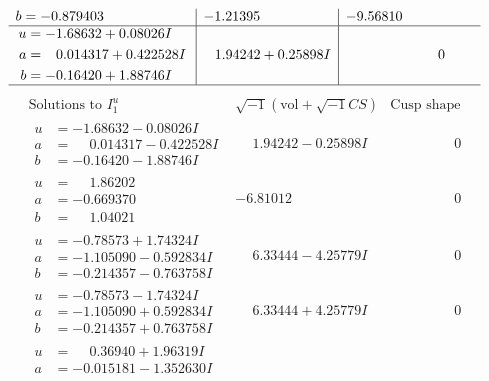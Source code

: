 \documentclass[1p]{elsarticle_modified}
\theoremstyle{definition}
\newcommand{\I}{\sqrt{-1}}
\begin{document}
$$\begin{array}{c|c|c}
\begin{aligned}
b &= -0.879403\phantom{ +0.000000I}\end{aligned}
 & -1.21395\phantom{ +0.000000I} & -9.56810\phantom{ +0.000000I} \\ \hline\begin{aligned}
u &= -1.68632 + 0.08026 I \\
a &= \phantom{-}0.014317 + 0.422528 I \\
b &= -0.16420 + 1.88746 I\end{aligned}
 & \phantom{-}1.94242 + 0.25898 I & \phantom{-0.000000 } 0\\
 \hline 
 \end{array}$$\newpage$$\begin{array}{c|c|c}  
\text{Solutions to }I^u_{1}& \I (\text{vol} + \sqrt{-1}CS) & \text{Cusp shape}\\
 \hline 
\begin{aligned}
u &= -1.68632 - 0.08026 I \\
a &= \phantom{-}0.014317 - 0.422528 I \\
b &= -0.16420 - 1.88746 I\end{aligned}
 & \phantom{-}1.94242 - 0.25898 I & \phantom{-0.000000 } 0 \\ \hline\begin{aligned}
u &= \phantom{-}1.86202\phantom{ +0.000000I} \\
a &= -0.669370\phantom{ +0.000000I} \\
b &= \phantom{-}1.04021\phantom{ +0.000000I}\end{aligned}
 & -6.81012\phantom{ +0.000000I} & \phantom{-0.000000 } 0 \\ \hline\begin{aligned}
u &= -0.78573 + 1.74324 I \\
a &= -1.105090 - 0.592834 I \\
b &= -0.214357 - 0.763758 I\end{aligned}
 & \phantom{-}6.33444 - 4.25779 I & \phantom{-0.000000 } 0 \\ \hline\begin{aligned}
u &= -0.78573 - 1.74324 I \\
a &= -1.105090 + 0.592834 I \\
b &= -0.214357 + 0.763758 I\end{aligned}
 & \phantom{-}6.33444 + 4.25779 I & \phantom{-0.000000 } 0 \\ \hline\begin{aligned}
u &= \phantom{-}0.36940 + 1.96319 I \\
a &= -0.015181 - 1.352630 I \\

\end{aligned}
\end{array}$$
\end{document}
